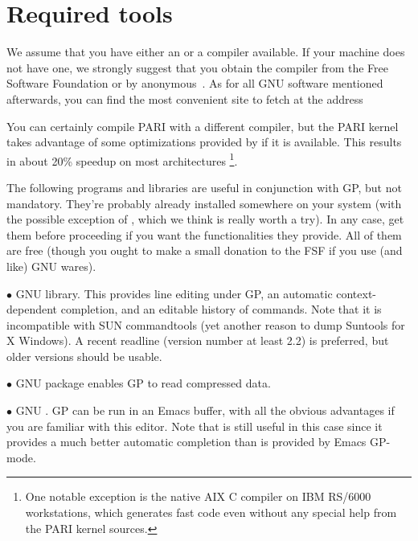 %
%

\def\tocwrite#1{}
\section{Required tools}

We assume that you have either an  or a  compiler
available. If your machine does not have one, we strongly suggest that you
obtain the  compiler from the Free Software Foundation or by
anonymous~. As for all GNU software mentioned afterwards, you can
find the most convenient site to fetch  at the address


\noindent
You can certainly compile PARI with a different compiler, but the PARI
kernel takes advantage of some optimizations provided by  if it is
available. This results in about 20\% speedup on most architectures%
\footnote*{One notable exception is the native AIX C compiler on IBM
RS/6000 workstations, which generates fast code even without any special
help from the PARI kernel sources.}.

 The following programs and libraries are useful
in conjunction with GP, but not mandatory. They're probably already installed
somewhere on your system (with the possible exception of ,
which we think is really worth a try). In any case, get them before
proceeding if you want the functionalities they provide. All of them are free
(though you ought to make a small donation to the FSF if you use (and like)
GNU wares).

  $\bullet$ GNU  library. This provides line editing under GP,
an automatic context-dependent completion, and an editable history of
commands. Note that it is incompatible with SUN commandtools (yet another
reason to dump Suntools for X Windows). A recent readline (version number at
least 2.2) is preferred, but older versions should be usable.

  $\bullet$ GNU  package enables GP to read
compressed data.

  $\bullet$ GNU . GP can be run in an Emacs buffer, with all the
obvious advantages if you are familiar with this editor. Note that
 is still useful in this case since it provides a much better
automatic completion than is provided by Emacs GP-mode.


